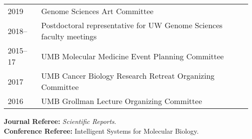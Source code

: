 \documentclass{article}
\newcommand{\mysection}[1]{\vspace{1ex}{\bf #1}}
\begin{document}
\mysection{Professional Service}

\begin{tabular}{p{0.5in}p{5.75in}}
  2019       & Genome Sciences Art Committee \\
  2018--     & Postdoctoral representative for UW Genome Sciences faculty meetings\\ 
  2015--17   & UMB Molecular Medicine Event Planning Committee \\
  2017       & UMB Cancer Biology Research Retreat Organizing Committee \\
  2016       & UMB Grollman Lecture Organizing Committee \\



\end{tabular}

{\bf Journal Referee: }{\em Scientific Reports}.\\
{\bf Conference Referee: }{Intelligent Systems for Molecular Biology}.
\end{document}
